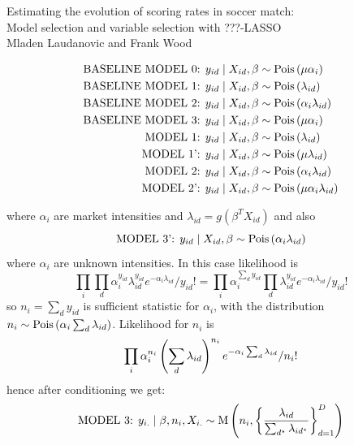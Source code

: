 \documentclass[12pt, letter]{article}
\begin{document}
 \begin{center}
 {\Large Estimating the evolution of scoring rates in soccer match: \\ Model selection and variable
 selection  with ???-LASSO}\\[1cm]
 {Mladen Laudanovic and Frank Wood}
 \end{center}
 

% 

%

%

\begin{equation*}
\begin{split}
\text{BASELINE MODEL 0:  }& y_{id}\mid X_{id}, \beta \sim \mathrm{Pois}\zag{\mu \alpha_{i}}\\
\text{BASELINE MODEL 1:  }& y_{id}\mid X_{id}, \beta \sim \mathrm{Pois}\zag{\lambda_{id}}\\
\text{BASELINE MODEL 2:  }& y_{id}\mid X_{id}, \beta \sim \mathrm{Pois}\zag{\alpha_{i}\lambda_{id}}\\
\text{BASELINE MODEL 3:  }& y_{id}\mid X_{id}, \beta \sim \mathrm{Pois}\zag{\mu \alpha_{i}}\\
\text{MODEL 1:  }& y_{id}\mid X_{id}, \beta \sim \mathrm{Pois}\zag{\lambda_{id}}\\
\text{MODEL 1':  }& y_{id}\mid X_{id}, \beta \sim \mathrm{Pois}\zag{\mu\lambda_{id}}\\
\text{MODEL 2:  }& y_{id}\mid X_{id}, \beta \sim \mathrm{Pois}\zag{\alpha_{i}\lambda_{id}}\\
\text{MODEL 2':  }& y_{id}\mid X_{id}, \beta \sim \mathrm{Pois}\zag{\mu\alpha_{i}\lambda_{id}}\\
\end{split}
\end{equation*}

where $\alpha_{i}$ are market intensities  and $\lambda_{id} = g(\beta^T X_{id})$ and also 
$$\text{MODEL 3':  } y_{id}\mid X_{id}, \beta \sim \mathrm{Pois}\zag{\alpha_{i}\lambda_{id}}$$
where $\alpha_{i}$ are unknown intensities. In this case likelihood is 
$$ \prod_i \prod_d \alpha_{i}^{y_{id}}\lambda_{id}^{y_{id}} e^{-\alpha_{i}\lambda_{id}}/y_{id}! = 
\prod_i \alpha_{i}^{\sum_d y_{id}} \prod_d \lambda_{id}^{y_{id}} e^{-\alpha_{i}\lambda_{id}}/y_{id}!$$ so $n_i = \sum_d y_{id}$ is sufficient statistic for $\alpha_i$, with the distribution $n_i \sim \mathrm{Pois}\zag{\alpha_{i}\sum_d\lambda_{id}}$. Likelihood for $n_i$ is  
$$ \prod_i \alpha_{i}^{n_{i}}\zag{\sum_d\lambda_{id}}^{n_{i}} e^{-\alpha_{i}\sum_d\lambda_{id}}/n_{i}! $$ hence after conditioning we get:
$$\text{MODEL 3:  } y_{i.}\mid \beta, n_i,  X_{i.}\sim \mathrm{M}
    \zag{n_i, \zagv{\frac{\lambda_{id}}{\sum_{d^\star}\lambda_{id^\star}}}_{d=1}^D}$$
 
\end{document}
